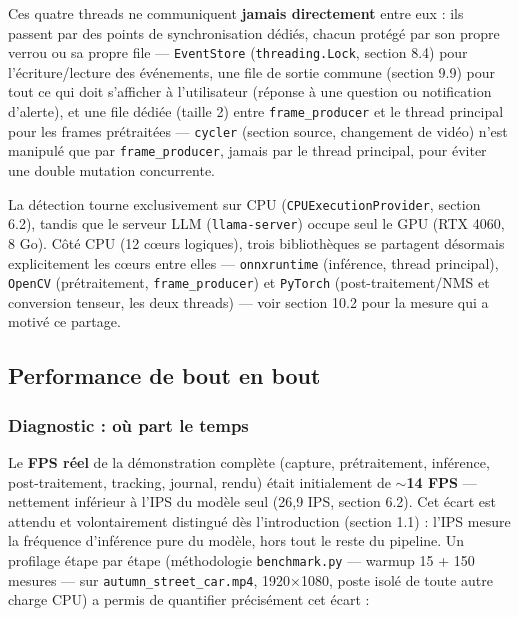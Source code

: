 \documentclass[11pt,a4paper]{article}
\let\Oldsubsection\subsection
\renewcommand{\subsection}{\FloatBarrier\Oldsubsection}
\let\Oldsubsubsection\subsubsection
\renewcommand{\subsubsection}{\FloatBarrier\Oldsubsubsection}
\begin{document}
    Ces quatre threads ne communiquent \textbf{jamais directement} entre
    eux : ils passent par des points de synchronisation dédiés, chacun
    protégé par son propre verrou ou sa propre file --- \texttt{EventStore}
    (\texttt{threading.Lock}, section 8.4) pour l'écriture/lecture des
    événements, une file de sortie commune (section 9.9) pour tout ce qui
    doit s'afficher à l'utilisateur (réponse à une question ou notification
    d'alerte), et une file dédiée (taille 2) entre \texttt{frame\_producer}
    et le thread principal pour les frames prétraitées --- \texttt{cycler}
    (section source, changement de vidéo) n'est manipulé que par
    \texttt{frame\_producer}, jamais par le thread principal, pour éviter
    une double mutation concurrente.
    
    La détection tourne exclusivement
    sur CPU (\texttt{CPUExecutionProvider}, section 6.2), tandis que le
    serveur LLM (\texttt{llama-server}) occupe seul le GPU (RTX 4060, 8 Go). Côté CPU (12 cœurs logiques), trois bibliothèques
    se partagent désormais explicitement les cœurs entre elles ---
    \texttt{onnxruntime} (inférence, thread principal), \texttt{OpenCV}
    (prétraitement, \texttt{frame\_producer}) et \texttt{PyTorch}
    (post-traitement/NMS et conversion tenseur, les deux threads) --- voir
    section 10.2 pour la mesure qui a motivé ce partage.
    
    \subsection{Performance de bout en bout}
    
    \subsubsection{Diagnostic : où part le temps}
    
    Le \textbf{FPS réel} de la démonstration complète (capture, prétraitement,
    inférence, post-traitement, tracking, journal, rendu) était initialement
    de \textbf{$\sim$14 FPS} --- nettement inférieur à l'IPS du modèle seul
    (26,9 IPS, section 6.2). Cet écart est attendu et volontairement
    distingué dès l'introduction (section 1.1) : l'IPS mesure la fréquence
    d'inférence pure du modèle, hors tout le reste du pipeline. Un
    profilage étape par étape (méthodologie \texttt{benchmark.py} --- warmup
    15 + 150 mesures --- sur \texttt{autumn\_street\_car.mp4}, 1920×1080,
    poste isolé de toute autre charge CPU) a permis de quantifier précisément
    cet écart :
    
\end{document}
